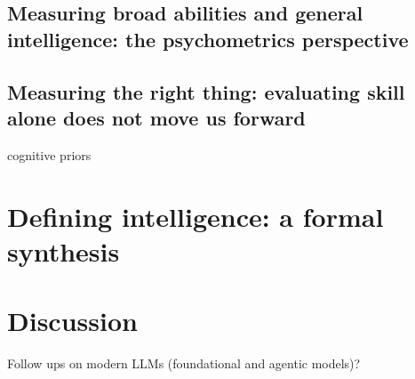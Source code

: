     \subsection{Measuring broad abilities and general intelligence: the psychometrics perspective}
    \subsection{Measuring the right thing: evaluating skill alone does not move us forward}
    cognitive priors

\section{Defining intelligence: a formal synthesis}
\section{Discussion}

Follow ups on modern LLMs (foundational and agentic models)?
